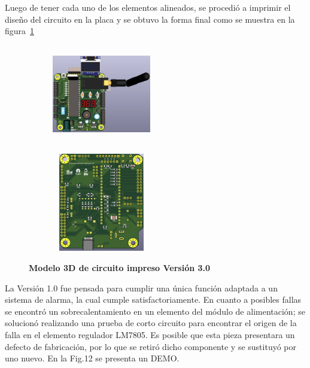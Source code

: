 \documentclass[times, 10pt,twocolumn]{article}
\newcommand{\Img}[5]{
   \begin{figure}[H]
   	   \centering
       \texttt{[image: Img/\#3]}
       \caption{ \centering \textbf{\small #4}}
       \label{#5}
       \end{figure}
   }
\begin{document}
Luego de tener cada uno de los elementos alineados, se procedió a imprimir el diseño del circuito en la placa y se obtuvo la forma final como se muestra en la figura~\ref{fig:11}

\begin{figure}[H]
  \begin{subfigure}[b]{0.4\columnwidth}
     \includegraphics[width=4.3cm, height=4.3cm]{Img/tercera_version_3d.png}
  \end{subfigure}
   \hspace{0.7cm}
  \begin{subfigure}[b]{0.4\columnwidth}
    \includegraphics[width=4.3cm, height=4.3cm]{Img/tercera_version_pcb_b.png}
  \end{subfigure}
   \caption{\centering \textbf{Modelo 3D de circuito impreso Versión 3.0}} 
   \label{fig:11}
 \end{figure}



La Versión 1.0 fue pensada para cumplir una única función adaptada a un sistema de alarma, la cual cumple satisfactoriamente. En cuanto a posibles fallas se encontró un sobrecalentamiento en un elemento del módulo de alimentación; se solucionó realizando una prueba de corto circuito para encontrar el origen de la falla en el elemento regulador LM7805. Es posible que esta pieza presentara un defecto de fabricación, por lo que se retiró dicho componente y se sustituyó por uno nuevo. En la Fig.12 se presenta un DEMO.\\
\end{document}
